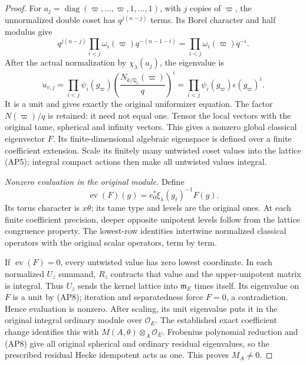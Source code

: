 \begin{proof}
For \(a_j=\operatorname{diag}(\varpi,\ldots,\varpi,1,\ldots,1)\),
with \(j\) copies of \(\varpi\), the unnormalized double coset has
\(q^{j(n-j)}\) terms.  Its Borel character and half modulus give
\[
 q^{j(n-j)}\prod_{i<j}\omega_i(\varpi)q^{-(n-1-i)}
                       =\prod_{i<j}\omega_i(\varpi)q^{-i}.
                                                        \tag{AP7}
\]
After the actual normalization by \(\chi_\lambda(a_j)\), the eigenvalue is
\[
 u_{v,j}=\prod_{i<j}\psi_i(g_\varpi)
              \left(\frac{N_{k/\mathbb Q_\ell}(\varpi)}q\right)^i
          =\prod_{i<j}\psi_i(g_\varpi)\epsilon(g_\varpi)^i.
                                                        \tag{AP8}
\]
It is a unit and gives exactly the original uniformizer equation.
The factor \(N(\varpi)/q\) is retained: it need not equal one.
Tensor the local vectors with the original tame, spherical and infinity
vectors.  This gives a nonzero global classical eigenvector \(F\).
Its finite-dimensional algebraic eigenspace is defined over a finite
coefficient extension.  Scale its finitely many untwisted coset values
into the lattice \textup{(AP5)}; integral compact actions then make all
untwisted values integral.

\emph{Nonzero evaluation in the original module.}
Define
\[
       \operatorname{ev}(F)(g)=e_0^*\xi_\lambda(g_\ell)^{-1}F(g).
                                                        \tag{AP9}
\]
Its torus character is \(x\theta\); its tame type and levels are the
original ones.  At each finite coefficient precision, deeper opposite
unipotent levels follow from the lattice congruence property.
The lowest-row identities intertwine normalized classical operators
with the original scalar operators, term by term.

If \(\operatorname{ev}(F)=0\), every untwisted value has zero lowest
coordinate.  In each normalized \(U_z\) summand, \(R_z\) contracts
that value and the upper-unipotent matrix is integral.  Thus \(U_z\)
sends the kernel lattice into \(\mathfrak m_E\) times itself.  Its
eigenvalue on \(F\) is a unit by \textup{(AP8)}; iteration and separatedness
force \(F=0\), a contradiction.  Hence evaluation is nonzero.
After scaling, its unit eigenvalue puts it in the original integral
ordinary module over \(\mathcal O_E\).  The established exact coefficient
change identifies this with \(M(A,\theta)\otimes_A\mathcal O_E\).
Frobenius polynomial reduction and \textup{(AP8)} give all original
spherical and ordinary residual eigenvalues, so the prescribed residual
Hecke idempotent acts as one.  This proves \(M_A\ne0\).


\end{proof}
